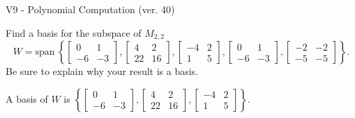 \begin{exercise}
  \begin{exerciseTitle}V9 - Polynomial Computation (ver. 40)\end{exerciseTitle}
  \begin{exerciseStatement}
    Find a basis for the subspace of \(M_{2,2}\) 
\[W=\mathrm{span}\ \left\{\left[\begin{array}{cc}
0 & 1 \\
-6 & -3
\end{array}\right] , \left[\begin{array}{cc}
4 & 2 \\
22 & 16
\end{array}\right] , \left[\begin{array}{cc}
-4 & 2 \\
1 & 5
\end{array}\right] , \left[\begin{array}{cc}
0 & 1 \\
-6 & -3
\end{array}\right] , \left[\begin{array}{cc}
-2 & -2 \\
-5 & -5
\end{array}\right]\right\}.\]
 Be sure to explain why your result is a basis.


  \end{exerciseStatement}
  \begin{exerciseAnswer}
   A basis of \(W\) is  \(\left\{\left[\begin{array}{cc}
0 & 1 \\
-6 & -3
\end{array}\right] , \left[\begin{array}{cc}
4 & 2 \\
22 & 16
\end{array}\right] , \left[\begin{array}{cc}
-4 & 2 \\
1 & 5
\end{array}\right]\right\}\).
  


  \end{exerciseAnswer}
\end{exercise}